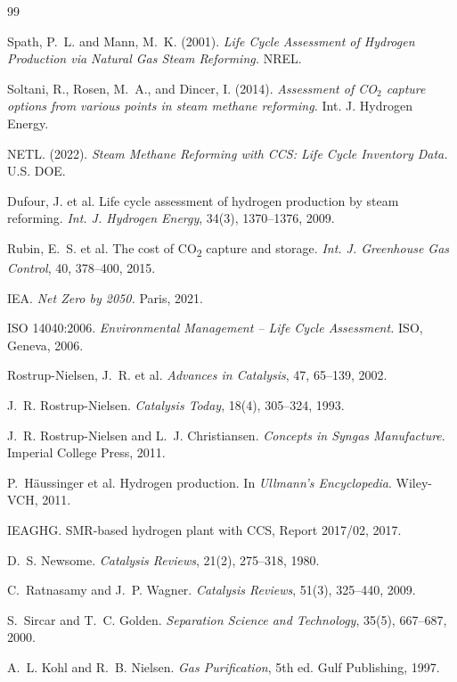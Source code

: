 \documentclass[12pt, a4paper]{report}
\begin{document}
\begin{thebibliography}{99}

Spath, P.~L. and Mann, M.~K. (2001). \textit{Life Cycle Assessment of Hydrogen Production via Natural Gas Steam Reforming.} NREL.

Soltani, R., Rosen, M.~A., and Dincer, I. (2014). \textit{Assessment of CO$_2$ capture options from various points in steam methane reforming.} Int. J. Hydrogen Energy.

NETL. (2022). \textit{Steam Methane Reforming with CCS: Life Cycle Inventory Data.} U.S. DOE.

Dufour, J. et al. Life cycle assessment of hydrogen production by steam reforming. \textit{Int. J. Hydrogen Energy}, 34(3), 1370--1376, 2009.

Rubin, E.~S. et al. The cost of CO\textsubscript{2} capture and storage. \textit{Int. J. Greenhouse Gas Control}, 40, 378--400, 2015.

IEA. \textit{Net Zero by 2050.} Paris, 2021.

ISO 14040:2006. \textit{Environmental Management -- Life Cycle Assessment.} ISO, Geneva, 2006.

Rostrup-Nielsen, J.~R. et al. \textit{Advances in Catalysis}, 47, 65--139, 2002.

J.~R. Rostrup-Nielsen. \textit{Catalysis Today}, 18(4), 305--324, 1993.

J.~R. Rostrup-Nielsen and L.~J. Christiansen. \textit{Concepts in Syngas Manufacture}. Imperial College Press, 2011.

P.~H\"{a}ussinger et al. Hydrogen production. In \textit{Ullmann's Encyclopedia}. Wiley-VCH, 2011.

IEAGHG. SMR-based hydrogen plant with CCS, Report 2017/02, 2017.

D.~S. Newsome. \textit{Catalysis Reviews}, 21(2), 275--318, 1980.

C.~Ratnasamy and J.~P. Wagner. \textit{Catalysis Reviews}, 51(3), 325--440, 2009.

S.~Sircar and T.~C. Golden. \textit{Separation Science and Technology}, 35(5), 667--687, 2000.

A.~L. Kohl and R.~B. Nielsen. \textit{Gas Purification}, 5th ed. Gulf Publishing, 1997.


\end{thebibliography}
\end{document}
